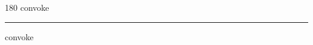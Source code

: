 
\begin{frame}
\begin{center}
\begin{turn}{180}
{\fontsize{2.5cm}{1em}\selectfont convoke}
\end{turn}
\vspace{1em}\par  
\hrule
\vspace{1em}\par  
{\fontsize{2.5cm}{1em}\selectfont convoke}
\end{center}
\end{frame}
